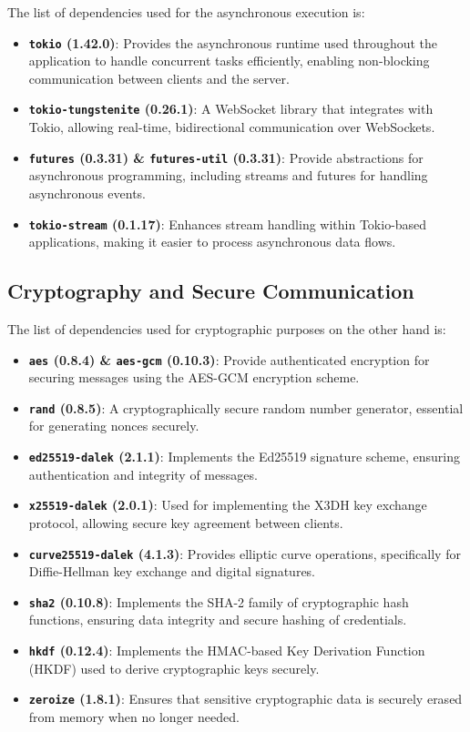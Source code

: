 The list of dependencies used for the asynchronous execution is:

\begin{itemize}
  \item \textbf{\texttt{tokio} (1.42.0)}: Provides the asynchronous runtime used throughout the application to handle concurrent tasks efficiently, enabling non-blocking communication between clients and the server.
  \item \textbf{\texttt{tokio-tungstenite} (0.26.1)}: A WebSocket library that integrates with Tokio, allowing real-time, bidirectional communication over WebSockets.
  \item \textbf{\texttt{futures} (0.3.31) \& \texttt{futures-util} (0.3.31)}: Provide abstractions for asynchronous programming, including streams and futures for handling asynchronous events.
  \item \textbf{\texttt{tokio-stream} (0.1.17)}: Enhances stream handling within Tokio-based applications, making it easier to process asynchronous data flows.
\end{itemize}

\subsection{Cryptography and Secure Communication}
\label{subsec:CryptographyAndSecureCommunication}

The list of dependencies used for cryptographic purposes on the other hand is:

\begin{itemize}
  \item \textbf{\texttt{aes} (0.8.4) \& \texttt{aes-gcm} (0.10.3)}: Provide authenticated encryption for securing messages using the AES-GCM encryption scheme.
  \item \textbf{\texttt{rand} (0.8.5)}: A cryptographically secure random number generator, essential for generating nonces securely.
  \item \textbf{\texttt{ed25519-dalek} (2.1.1)}: Implements the Ed25519 signature scheme, ensuring authentication and integrity of messages.
  \item \textbf{\texttt{x25519-dalek} (2.0.1)}: Used for implementing the X3DH key exchange protocol, allowing secure key agreement between clients.
  \item \textbf{\texttt{curve25519-dalek} (4.1.3)}: Provides elliptic curve operations, specifically for Diffie-Hellman key exchange and digital signatures.
  \item \textbf{\texttt{sha2} (0.10.8)}: Implements the SHA-2 family of cryptographic hash functions, ensuring data integrity and secure hashing of credentials.
  \item \textbf{\texttt{hkdf} (0.12.4)}: Implements the HMAC-based Key Derivation Function (HKDF) used to derive cryptographic keys securely.
  \item \textbf{\texttt{zeroize} (1.8.1)}: Ensures that sensitive cryptographic data is securely erased from memory when no longer needed.
\end{itemize}

